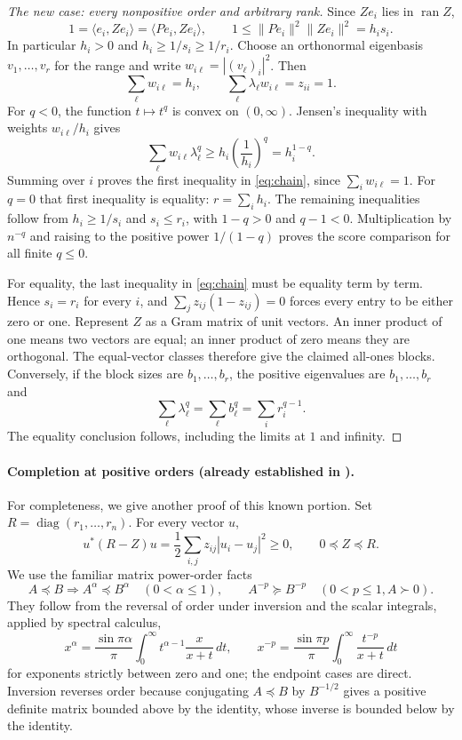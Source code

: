 \documentclass[11pt]{article}
\begin{document}
\begin{proof}[The new case: every nonpositive order and arbitrary rank]
Since $Ze_i$ lies in $\operatorname{ran}Z$,
\[
 1=\langle e_i,Ze_i\rangle=\langle Pe_i,Ze_i\rangle,
 \qquad
 1\leq\|Pe_i\|^2\|Ze_i\|^2=h_i s_i.
\]
In particular $h_i>0$ and $h_i\geq1/s_i\geq1/r_i$.
Choose an orthonormal eigenbasis $v_1,\ldots,v_r$ for the range and write
$w_{i\ell}=|(v_\ell)_i|^2$. Then
\[
 \sum_\ell w_{i\ell}=h_i,\qquad
 \sum_\ell\lambda_\ell w_{i\ell}=z_{ii}=1.
\]
For $q<0$, the function $t\mapsto t^q$ is convex on $(0,\infty)$.
Jensen's inequality with weights $w_{i\ell}/h_i$ gives
\[
 \sum_\ell w_{i\ell}\lambda_\ell^q
 \geq h_i\left(\frac1{h_i}\right)^q=h_i^{1-q}.
\]
Summing over $i$ proves the first inequality in \eqref{eq:chain}, since
$\sum_iw_{i\ell}=1$. For $q=0$ that first inequality is equality:
$r=\sum_i h_i$. The remaining inequalities follow from $h_i\geq1/s_i$
and $s_i\leq r_i$, with $1-q>0$ and $q-1<0$.
Multiplication by $n^{-q}$ and raising to the positive power $1/(1-q)$
proves the score comparison for all finite $q\leq0$.

For equality, the last inequality in \eqref{eq:chain} must be equality
term by term. Hence $s_i=r_i$ for every $i$, and
$\sum_jz_{ij}(1-z_{ij})=0$ forces every entry to be either zero or one.
Represent $Z$ as a Gram matrix of unit vectors. An inner product of one
means two vectors are equal; an inner product of zero means they are
orthogonal. The equal-vector classes therefore give the claimed all-ones
blocks. Conversely, if the block sizes are $b_1,\ldots,b_r$, the positive
eigenvalues are $b_1,\ldots,b_r$ and
\[
 \sum_\ell\lambda_\ell^q=\sum_\ell b_\ell^q
 =\sum_i r_i^{q-1}.
\]
The equality conclusion follows, including the limits at $1$ and infinity.
\end{proof}

\paragraph{Completion at positive orders (already established in \cite{N}).}
For completeness, we give another proof of this known portion.
Set $R=\operatorname{diag}(r_1,\ldots,r_n)$. For every vector $u$,
\[
 u^*(R-Z)u=\frac12\sum_{i,j}z_{ij}|u_i-u_j|^2\geq0,
 \qquad 0\preceq Z\preceq R.
\]
We use the familiar matrix power-order facts
\[
 A\preceq B\Longrightarrow A^\alpha\preceq B^\alpha\quad(0<\alpha\leq1),
 \qquad
 A^{-p}\succeq B^{-p}\quad(0<p\leq1, A\succ0).
\]
They follow from the reversal of order under inversion and the scalar
integrals, applied by spectral calculus,
\[
 x^\alpha=\frac{\sin\pi\alpha}{\pi}
 \int_0^\infty t^{\alpha-1}\frac{x}{x+t}\,dt,
 \qquad
 x^{-p}=\frac{\sin\pi p}{\pi}
 \int_0^\infty\frac{t^{-p}}{x+t}\,dt
\]
for exponents strictly between zero and one; the endpoint cases are direct.
Inversion reverses order because conjugating $A\preceq B$ by $B^{-1/2}$
gives a positive definite matrix bounded above by the identity, whose
inverse is bounded below by the identity.
\end{document}
